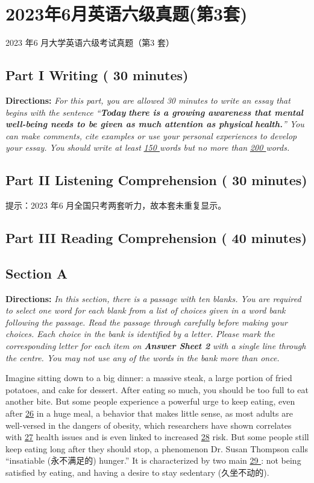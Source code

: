 \documentclass[UTF8,11pt]{ctexart}
\begin{document}
\section*{2023年6月英语六级真题(第3套)}
2023 年6 月大学英语六级考试真题（第3 套）


\subsection*{\textbf{Part I Writing} \textbf{( 30 minutes)}}


\textbf{Directions:}\textit{ For this part, you are allowed 30 minutes to write an essay that begins with the sentence “}\textbf{\textit{Today}} \textbf{\textit{there is a growing awareness that mental well-being needs to be given as much attention as physical}} \textbf{\textit{health.}}\textit{” You can make comments, cite examples or use your personal experiences to develop your essay. You} \textit{should write at least }\textit{\uline{150 }}\textit{words but no more than }\textit{\uline{200 }}\textit{words.}


\subsection*{\textbf{Part II} \textbf{Listening Comprehension} \textbf{( 30 minutes)}}


提示：2023 年6 月全国只考两套听力，故本套未重复显示。


\subsection*{\textbf{Part III Reading Comprehension ( 40 minutes)}}


\subsection*{\textbf{Section A}}


\textbf{Directions:} \textit{In this section, there is a passage with ten blanks. You are required to select one word for each} \textit{blank from a list of choices given in a word bank following the passage. Read the passage through carefully} \textit{before making your choices. Each choice in the bank is identified by a letter. Please mark the corresponding} \textit{letter for each item on }\textbf{\textit{Answer Sheet 2}}\textit{ with a single line through the centre. You may not use any of the words} \textit{in the bank more than once.}


Imagine sitting down to a big dinner: a massive steak, a large portion of fried potatoes, and cake for dessert. After eating so much, you should be too full to eat another bite. But some people experience a powerful urge to keep eating, even after \uline{26} in a huge meal, a behavior that makes little sense, as most adults are well-versed in the dangers of obesity, which researchers have shown correlates with \uline{27} health issues and is even linked to increased \uline{28} risk. But some people still keep eating long after they should stop, a phenomenon Dr. Susan Thompson calls “insatiable (永不满足的) hunger.” It is characterized by two main \uline{29 }: not being satisfied by eating, and having a desire to stay sedentary (久坐不动的).
\end{document}
